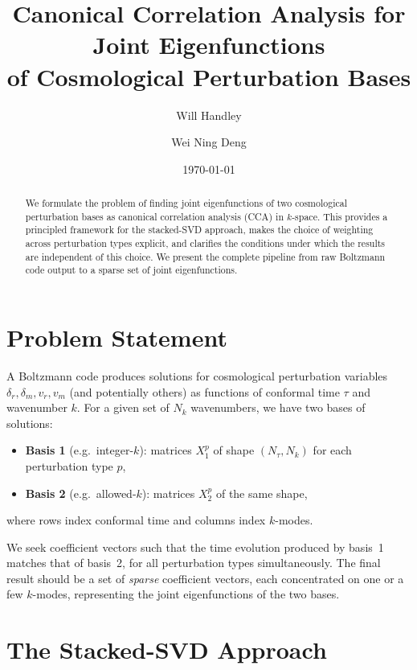 \documentclass[a4paper,11pt]{article}
\title{Canonical Correlation Analysis for Joint Eigenfunctions\\of Cosmological Perturbation Bases}
\author{Will Handley \and Wei Ning Deng}
\date{\today}
\newcommand{\Xb}[2]{X_{#1}^{#2}}
\newcommand{\Nk}{N_k}
\newcommand{\Nt}{N_\tau}
\theoremstyle{plain}
\begin{document}
\maketitle

\begin{abstract}
We formulate the problem of finding joint eigenfunctions of two cosmological perturbation bases as canonical correlation analysis (CCA) in $k$-space.
This provides a principled framework for the stacked-SVD approach, makes the choice of weighting across perturbation types explicit, and clarifies the conditions under which the results are independent of this choice.
We present the complete pipeline from raw Boltzmann code output to a sparse set of joint eigenfunctions.
\end{abstract}

\section{Problem Statement}
\label{sec:problem}

A Boltzmann code produces solutions for cosmological perturbation variables $\delta_r, \delta_m, v_r, v_m$ (and potentially others) as functions of conformal time $\tau$ and wavenumber $k$.
For a given set of $\Nk$ wavenumbers, we have two bases of solutions:
\begin{itemize}
    \item \textbf{Basis 1} (e.g.\ integer-$k$): matrices $\Xb{1}{p}$ of shape $(\Nt, \Nk)$ for each perturbation type $p$,
    \item \textbf{Basis 2} (e.g.\ allowed-$k$): matrices $\Xb{2}{p}$ of the same shape,
\end{itemize}
where rows index conformal time and columns index $k$-modes.

We seek coefficient vectors such that the time evolution produced by basis~1 matches that of basis~2, for all perturbation types simultaneously.
The final result should be a set of \emph{sparse} coefficient vectors, each concentrated on one or a few $k$-modes, representing the joint eigenfunctions of the two bases.

\section{The Stacked-SVD Approach}
\label{sec:stacking}
\end{document}
